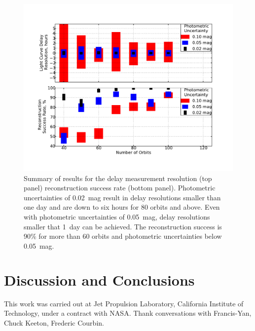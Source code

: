 \documentclass{emulateapj}
\begin{document}
\begin{figure}[t]
\begin{center}
\includegraphics[width=\linewidth]{./systematics_smy.pdf}
\caption{Summary of results for the delay measurement resolution (top panel) reconstruction success rate (bottom panel). Photometric uncertainties of 0.02~mag result in delay resolutions smaller than one day and are down to six hours for 80 orbits and above. Even with photometric uncertainties of 0.05~mag, delay resolutions smaller that 1~day can be achieved. The reconstruction success is 90\% for more than 60 orbits and photometric uncertainties below 0.05~mag.}\label{fig:volume}
\end{center}
\end{figure}

\section{Discussion and Conclusions}\label{sec:disc}

\acknowledgements

This work was carried out at Jet Propulsion Laboratory, California
Institute of Technology, under a contract with NASA.  Thank conversations with Francis-Yan, Chuck Keeton, Frederic Courbin. 




\end{document}
